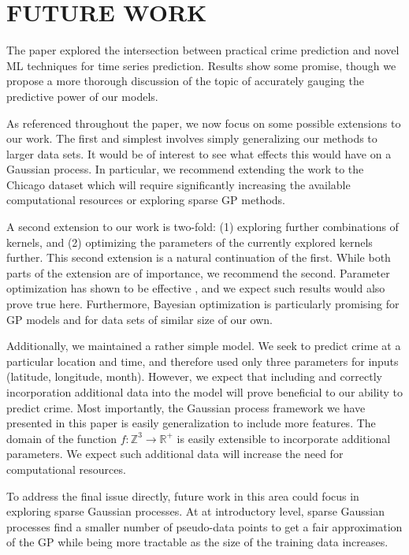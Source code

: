 \documentclass[letterpaper, 11 pt, conference]{ieeeconf}  %
\begin{document}
\section{FUTURE WORK}
The paper explored the intersection between practical crime prediction and novel ML techniques for time series prediction. Results show some promise, though we propose a more thorough discussion of the topic of accurately gauging the predictive power of our models. 

As referenced throughout the paper, we now focus on some possible extensions to our work. The first and simplest involves simply generalizing our methods to larger data sets. It would be of interest to see what effects this would have on a Gaussian process. In particular, we recommend extending the work to the Chicago dataset which will require significantly increasing the available computational resources or exploring sparse GP methods.

A second extension to our work is two-fold: (1) exploring further combinations of kernels, and (2) optimizing the parameters of the currently explored kernels further. This second extension is a natural continuation of the first. While both parts of the extension are of importance, we recommend the second. Parameter optimization has shown to be effective \cite{bayes_opt}, and we expect such results would also prove true here. Furthermore, Bayesian optimization is particularly promising for GP models and for data sets of similar size of our own.

Additionally, we maintained a rather simple model. We seek to predict crime at a particular location and time, and therefore used only three parameters for inputs (latitude, longitude, month). However, we expect that including and correctly incorporation additional data into the model will prove beneficial to our ability to predict crime. Most importantly, the Gaussian process framework we have presented in this paper is easily generalization to include more features. The domain of the function $f: \mathbb{Z}^3 \to \mathbb{R}^+$ is easily extensible to incorporate additional parameters. We expect such additional data will increase the need for computational resources. 

To address the final issue directly, future work in this area could focus in exploring sparse Gaussian processes. At at introductory level, sparse Gaussian processes find a smaller number of pseudo-data points to get a fair approximation of the GP while being more tractable as the size of the training data increases. 
\end{document}
